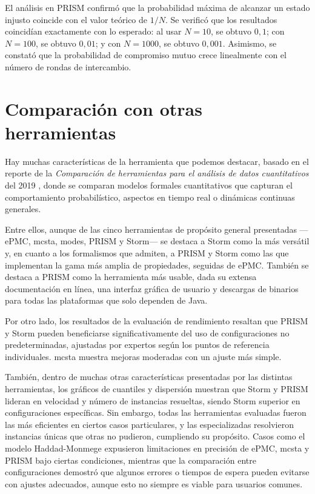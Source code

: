 \documentclass[runningheads]{llncs}
\begin{document}
El análisis en PRISM confirmó que la probabilidad máxima de alcanzar un estado injusto coincide con el valor teórico de $1/N$. Se verificó que los resultados coincidían exactamente con lo esperado: al usar $N = 10$, se obtuvo $0,1$; con $N = 100$, se obtuvo $0,01$; y con $N =1000$, se obtuvo $0,001$. Asimismo, se constató que la probabilidad de compromiso mutuo crece linealmente con el número de rondas de intercambio.

\section{Comparación con otras herramientas}
Hay muchas características de la herramienta que podemos destacar, basado en el reporte de la \textit{Comparación de herramientas para el análisis de datos cuantitativos} del 2019 \cite{Hahn2019}, donde se comparan modelos formales cuantitativos que capturan el comportamiento probabilístico, aspectos en tiempo real o dinámicas continuas generales.

Entre ellos, aunque de las cinco herramientas de propósito general presentadas —ePMC, mcsta, modes, PRISM y Storm— se destaca a Storm como la más versátil y, en cuanto a los formalismos que admiten, a PRISM y Storm como las que implementan la gama más amplia de propiedades, seguidas de ePMC. También se destaca a PRISM como la herramienta más usable, dada su extensa documentación en línea, una interfaz gráfica de usuario y descargas de binarios para todas las plataformas que solo dependen de Java.

Por otro lado, los resultados de la evaluación de rendimiento resaltan que PRISM y Storm pueden beneficiarse significativamente del uso de configuraciones no predeterminadas, ajustadas por expertos según los puntos de referencia individuales. mcsta muestra mejoras moderadas con un ajuste más simple.

También, dentro de muchas otras características presentadas por las distintas herramientas, los gráficos de cuantiles y dispersión muestran que Storm y PRISM lideran en velocidad y número de instancias resueltas, siendo Storm superior en configuraciones específicas. Sin embargo, todas las herramientas evaluadas fueron las más eficientes en ciertos casos particulares, y las especializadas resolvieron instancias únicas que otras no pudieron, cumpliendo su propósito. Casos como el modelo Haddad-Monmege expusieron limitaciones en precisión de ePMC, mcsta y PRISM bajo ciertas condiciones, mientras que la comparación entre configuraciones demostró que algunos errores o tiempos de espera pueden evitarse con ajustes adecuados, aunque esto no siempre es viable para usuarios comunes.
\end{document}
